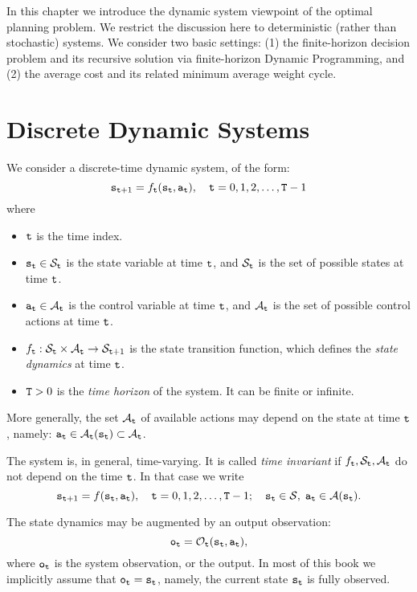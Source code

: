 

In this chapter we introduce the dynamic system viewpoint of the
optimal planning problem. We restrict the discussion here to
deterministic (rather than stochastic) systems. We consider two
basic settings: (1) the finite-horizon decision problem and its
recursive solution via finite-horizon Dynamic Programming, and (2) the
average cost and its related minimum average weight cycle.

\section{Discrete Dynamic Systems}
We consider a discrete-time dynamic system, of the form:
\[{{\tt s}_{{\tt t} + 1}} = {f_{{\tt t}}}({{\tt s}_{{\tt t}}},{{\tt a}_{{\tt t}}}),\quad {\tt t} = 0,1,2, \ldots ,{\tt T} - 1\]
where
\begin{itemize}
  \item ${\tt t}$ is the time index.
  \item ${{\tt s}_{{\tt t}}} \in {\mathcal{S}_{{\tt t}}}$ is the state variable at time ${\tt t}$, and $\mathcal{S}_{{\tt t}}$ is the set of possible states at time
  ${\tt t}$.
  \item ${{\tt a}_{{\tt t}}} \in {\mathcal{A}_{{\tt t}}}$  is the control variable at time ${\tt t}$, and $\mathcal{A}_{{\tt t}}$ is the set of possible control actions at time
  ${\tt t}$.
  \item ${f_{{\tt t}}}:{\mathcal{S}_{{\tt t}}} \times {\mathcal{A}_{{\tt t}}} \to {\mathcal{S}_{{\tt t}+ 1}}$ is the state transition function, which defines the \emph{state dynamics} at time
  ${\tt t}$.
  \item ${\tt T}>0$ is the \emph{time horizon} of the system.  It can be finite or infinite.
\end{itemize}

\begin{remark}
    More generally, the set $\mathcal{A}_{{\tt t}}$ of available actions may depend on the state at time ${\tt t}$, namely: ${\tt a}_{{\tt t}} \in {\mathcal{A}_{{\tt t}}}({{\tt s}_{{\tt t}}}) \subset
    {\mathcal{A}_{{\tt t}}}$.
\end{remark}
\begin{remark}
The system is, in general, time-varying. It is called \emph{time
invariant} if ${f_{{\tt t}}},{\mathcal{S}_{{\tt t}}},{\mathcal{A}_{{\tt t}}}$
do not depend on the time ${\tt t}$. In that case we
    write
\[{{\tt s}_{{\tt t} + 1}} = f({{\tt s}_{{\tt t}}},{{\tt a}_{{\tt t}}}),\quad {\tt t} = 0,1,2, \ldots ,{\tt T} - 1;\quad {{\tt s}_{{\tt t}}} \in \mathcal{S},\;{{\tt a}_{{\tt t}}} \in
\mathcal{A}({{\tt s}_{{\tt t}}}).\]
\end{remark}
\begin{remark}
    The state dynamics may be augmented by an output observation:
\[{{\tt o}_{{\tt t}}} = {\mathcal{O}_{{\tt t}}}({{\tt s}_{{\tt t}}},{{\tt a}_{{\tt t}}}),\]
where  ${\tt o}_{{\tt t}}$ is the system observation, or the
output. In most of this book we  implicitly assume that
${\tt o}_{{\tt t}}={\tt s}_{{\tt t}}$, namely, the current state
${\tt s}_{{\tt t}}$ is fully observed.
\end{remark}

